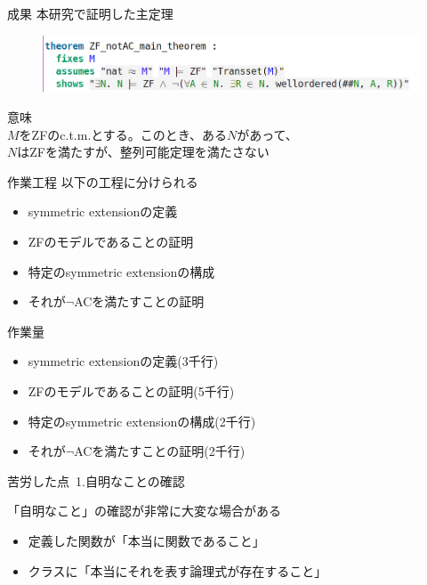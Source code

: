 \documentclass[17pt,aspectratio=169]{beamer}
\begin{document}
\begin{frame}{成果}
    本研究で証明した主定理
    \vspace{-1cm}
    \hspace{-1.5cm}
    \begin{figure}
        \includegraphics[width=1.1\linewidth]{./images/ZF_notAC_main_theorem.png}
    \end{figure}

    \vspace{-5pt}
    意味 \\
    {\small
    \hspace{1cm} $M$をZFのc.t.m.とする。このとき、ある$N$があって、\\
    \hspace{1cm} $N$はZFを満たすが、整列可能定理を満たさない
    }
\end{frame}

\begin{frame}{作業工程}
    以下の工程に分けられる
    {\small
    \begin{itemize}[itemsep=8pt]
        \item symmetric extensionの定義
        \item ZFのモデルであることの証明
        \item 特定のsymmetric extensionの構成
        \item それが$\neg$ACを満たすことの証明
    \end{itemize} }
\end{frame}

\begin{frame}{作業量}
    {\small
        \begin{itemize}[itemsep=8pt]
            \item symmetric extensionの定義(3千行)
            \item ZFのモデルであることの証明(5千行)
            \item 特定のsymmetric extensionの構成(2千行)
            \item それが$\neg$ACを満たすことの証明(2千行)
        \end{itemize} }
\end{frame}

\begin{frame}{苦労した点\, {\normalsize 1.自明なことの確認}}

    「自明なこと」の確認が非常に大変な場合がある

    {\small
    \begin{itemize}
        \item 定義した関数が「本当に関数であること」
        \item クラスに「本当にそれを表す論理式が存在すること」
    \end{itemize}
    }
\end{frame}
\end{document}
